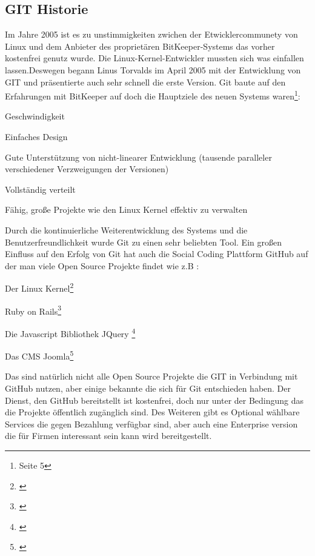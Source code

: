 \documentclass[12pt,a4paper,bibliography=totocnumbered,listof=totocnumbered]{scrartcl}
\begin{document}

\subsection{GIT Historie }
Im Jahre 2005 ist es zu unstimmigkeiten zwichen der Etwicklercommunety von Linux und dem Anbieter des proprietären BitKeeper-Systems das vorher kostenfrei genutz wurde. Die Linux-Kernel-Entwickler mussten sich was einfallen lassen.Deswegen begann  Linus Torvalds im April 2005 mit der Entwicklung von GIT und präsentierte auch sehr schnell die erste Version. Git baute auf den Erfahrungen mit BitKeeper auf doch die Hauptziele des neuen Systems waren\footnote{\cite{chacon2009pro} Seite 5}:

\begin{compactitem}
	\item Geschwindigkeit
	\item Einfaches Design
	\item Gute Unterstützung von nicht-linearer Entwicklung (tausende paralleler verschiedener Verzweigungen der Versionen)
	\item Vollständig verteilt
	\item Fähig, große Projekte wie den Linux Kernel effektiv zu verwalten
\end{compactitem}
Durch die kontinuierliche Weiterentwicklung des Systems und die Benutzerfreundlichkeit wurde Git zu einen sehr beliebten Tool.
Ein großen Einfluss auf den Erfolg von Git hat auch die Social Coding Plattform GitHub auf der man viele Open Source Projekte findet wie z.B :

\begin{compactitem}
	\item Der Linux Kernel\footnote{\cite{linux}}
	\item Ruby on Rails\footnote{\cite{ruby}}
	\item Die Javascript Bibliothek JQuery \footnote{\cite{jquery}}
	\item Das CMS Joomla\footnote{\cite{joomla}}
\end{compactitem}

Das sind natürlich nicht alle Open Source Projekte die GIT in Verbindung mit GitHub nutzen, aber einige bekannte die sich für Git entschieden haben. Der Dienst, den GitHub bereitstellt ist kostenfrei, doch nur unter der Bedingung das die Projekte öffentlich zugänglich sind. Des Weiteren gibt es Optional wählbare Services die gegen Bezahlung verfügbar sind, aber auch eine Enterprise version die für Firmen interessant sein kann wird bereitgestellt.    
\pagebreak
\end{document}
